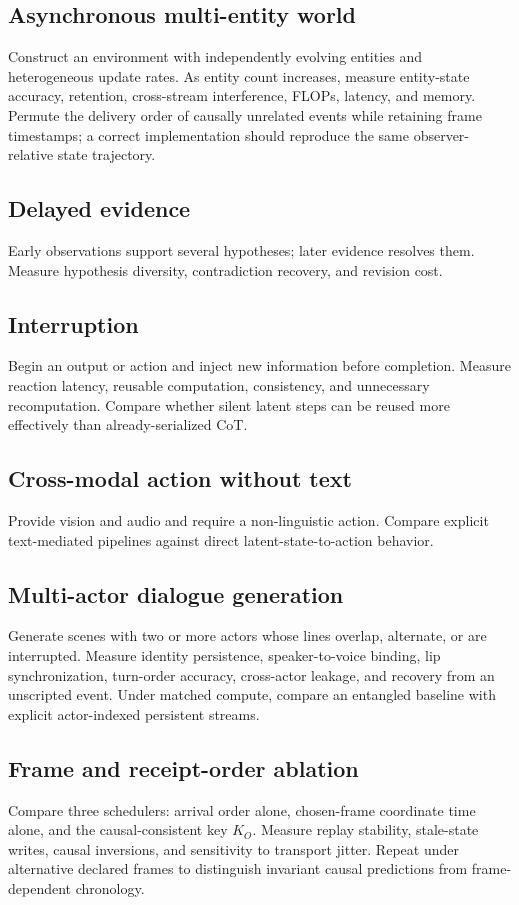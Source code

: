 \documentclass[10pt,twocolumn]{article}
\begin{document}
\subsection{Asynchronous multi-entity world}
Construct an environment with independently evolving entities and heterogeneous update rates. As entity count increases, measure entity-state accuracy, retention, cross-stream interference, FLOPs, latency, and memory. Permute the delivery order of causally unrelated events while retaining frame timestamps; a correct implementation should reproduce the same observer-relative state trajectory.

\subsection{Delayed evidence}
Early observations support several hypotheses; later evidence resolves them. Measure hypothesis diversity, contradiction recovery, and revision cost.

\subsection{Interruption}
Begin an output or action and inject new information before completion. Measure reaction latency, reusable computation, consistency, and unnecessary recomputation. Compare whether silent latent steps can be reused more effectively than already-serialized CoT.

\subsection{Cross-modal action without text}
Provide vision and audio and require a non-linguistic action. Compare explicit text-mediated pipelines against direct latent-state-to-action behavior.

\subsection{Multi-actor dialogue generation}
Generate scenes with two or more actors whose lines overlap, alternate, or are interrupted. Measure identity persistence, speaker-to-voice binding, lip synchronization, turn-order accuracy, cross-actor leakage, and recovery from an unscripted event. Under matched compute, compare an entangled baseline with explicit actor-indexed persistent streams.

\subsection{Frame and receipt-order ablation}
Compare three schedulers: arrival order alone, chosen-frame coordinate time alone, and the causal-consistent key $K_O$. Measure replay stability, stale-state writes, causal inversions, and sensitivity to transport jitter. Repeat under alternative declared frames to distinguish invariant causal predictions from frame-dependent chronology.
\end{document}
